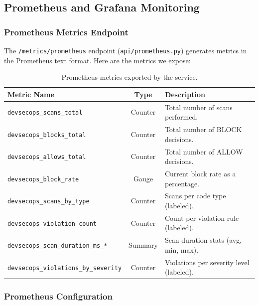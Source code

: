 
\subsection{Prometheus and Grafana Monitoring}

\subsubsection{Prometheus Metrics Endpoint}

The \texttt{/metrics/prometheus} endpoint (\texttt{api/prometheus.py}) generates metrics in the Prometheus text format. Here are the metrics we expose:

\begin{table}[H]
\centering
\begin{tabularx}{\textwidth}{|l|c|X|}
\hline
\textbf{Metric Name} & \textbf{Type} & \textbf{Description} \\
\hline
\texttt{devsecops\_scans\_total}            & Counter & Total number of scans performed. \\
\hline
\texttt{devsecops\_blocks\_total}           & Counter & Total number of BLOCK decisions. \\
\hline
\texttt{devsecops\_allows\_total}           & Counter & Total number of ALLOW decisions. \\
\hline
\texttt{devsecops\_block\_rate}             & Gauge   & Current block rate as a percentage. \\
\hline
\texttt{devsecops\_scans\_by\_type}         & Counter & Scans per code type (labeled). \\
\hline
\texttt{devsecops\_violation\_count}        & Counter & Count per violation rule (labeled). \\
\hline
\texttt{devsecops\_scan\_duration\_ms\_*}   & Summary & Scan duration stats (avg, min, max). \\
\hline
\texttt{devsecops\_violations\_by\_severity} & Counter & Violations per severity level (labeled). \\
\hline
\end{tabularx}
\caption{Prometheus metrics exported by the service.}
\label{tab:prometheus-metrics}
\end{table}

\subsubsection{Prometheus Configuration}

